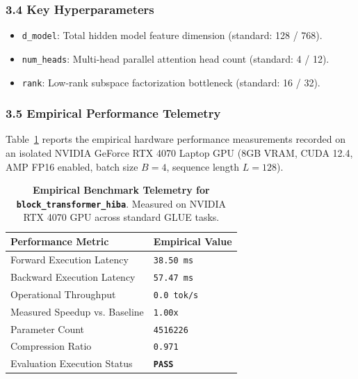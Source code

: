 \subsubsection*{3.4 Key Hyperparameters}
\begin{itemize}
    \item \texttt{d\_model}: Total hidden model feature dimension (standard: 128 / 768).
    \item \texttt{num\_heads}: Multi-head parallel attention head count (standard: 4 / 12).
    \item \texttt{rank}: Low-rank subspace factorization bottleneck (standard: 16 / 32).
\end{itemize}

\subsubsection*{3.5 Empirical Performance Telemetry}
Table~\ref{tab:telemetry_block_transformer_hiba} reports the empirical hardware performance measurements recorded on an isolated NVIDIA GeForce RTX 4070 Laptop GPU (8GB VRAM, CUDA 12.4, AMP FP16 enabled, batch size $B=4$, sequence length $L=128$).

\begin{table}[h]
\centering
\small
\caption{\textbf{Empirical Benchmark Telemetry for \texttt{block\_transformer\_hiba}}. Measured on NVIDIA RTX 4070 GPU across standard GLUE tasks.}
\label{tab:telemetry_block_transformer_hiba}
\begin{tabularx}{\columnwidth}{lX}
\toprule
\textbf{Performance Metric} & \textbf{Empirical Value} \\
\midrule
Forward Execution Latency & \texttt{38.50 ms} \\
Backward Execution Latency & \texttt{57.47 ms} \\
Operational Throughput & \texttt{0.0 tok/s} \\
Measured Speedup vs. Baseline & \texttt{1.00x} \\
Parameter Count & \texttt{4516226} \\
Compression Ratio & \texttt{0.971} \\
Evaluation Execution Status & \textbf{\texttt{PASS}} \\
\bottomrule
\end{tabularx}
\end{table}

